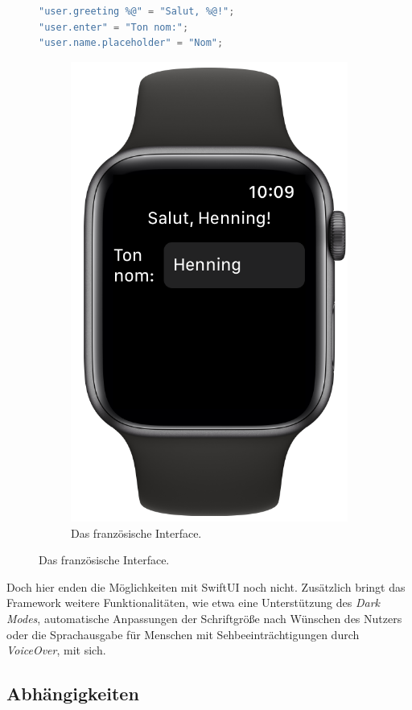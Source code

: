 \begin{figure}[ht]
\begin{minipage}{0.5\textwidth}
\begin{lstlisting}[title={\texttt{Localizable.strings (French)}},label={lst:swiftui-greeting-fr},language=Swift]
"user.greeting %@" = "Salut, %@!";
"user.enter" = "Ton nom:";
"user.name.placeholder" = "Nom";
\end{lstlisting}\setcounter{lstannotation}{0}
\begin{figure}[H]
\centering
\includegraphics[width=.6\textwidth]{./images/methodology/swiftui/watch-fr.png}
\caption{\label{bsp:ui:fr}Das französische Interface.}
\end{figure}
\end{minipage}
\end{figure}

Doch hier enden die Möglichkeiten mit SwiftUI noch nicht. Zusätzlich bringt das Framework weitere Funktionalitäten, wie etwa eine Unterstützung des \emph{Dark Modes}, automatische Anpassungen der Schriftgröße nach Wünschen des Nutzers oder die Sprachausgabe für Menschen mit Sehbeeinträchtigungen durch \emph{VoiceOver}, mit sich.

\subsection{Abhängigkeiten}\label{sec:swiftui:dependencies}

